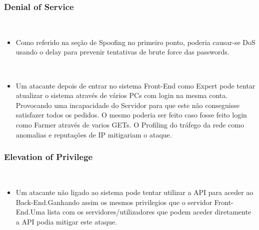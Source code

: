 \subsubsection{Denial of Service}
\hfill\\
\begin{itemize}

\item Como referido na seção de Spoofing no primeiro ponto, poderia causar-se DoS usando o delay para prevenir tentativas de brute force das passwords.

\hfill\\
\item Um atacante depois de entrar no sistema Front-End como Expert pode tentar atualizar o sistema através de vários PCs com login na mesma conta. Provocando uma incapacidade do Servidor para que este não conseguisse satisfazer todos os pedidos. O mesmo poderia ser feito caso fosse feito login como Farmer através de varios GETs. O Profiling do tráfego da rede como anomalias e reputações de IP mitigariam o ataque.

\end{itemize}

\subsubsection{Elevation of Privilege}
\hfill\\

\begin{itemize}

\item Um atacante não ligado ao sistema pode tentar utilizar a API para aceder ao Back-End.Ganhando assim os mesmos privilegios que o servidor Front-End.Uma lista com os servidores/utilizadores que podem aceder diretamente a API podia mitigar este ataque.

\end{itemize}

\hfill\\


